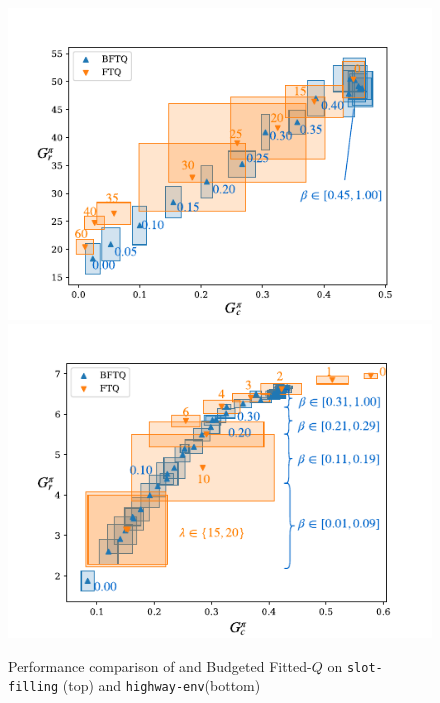 \begin{figure}[tp]
    \begin{center}
        \includegraphics[width=0.75\linewidth]{sources/contribution/nips/source/img/slot-filling}\\
        \includegraphics[width=0.75\linewidth]{sources/contribution/nips/source/img/highway}
        \caption[Results on \texttt{slot-filling} and \texttt{highway-env}]{Performance comparison of \FTQl and Budgeted Fitted-$Q$ on \texttt{slot-filling} (top) and \texttt{highway-env}(bottom) }
        \label{fig:results}
    \end{center}
\end{figure}

